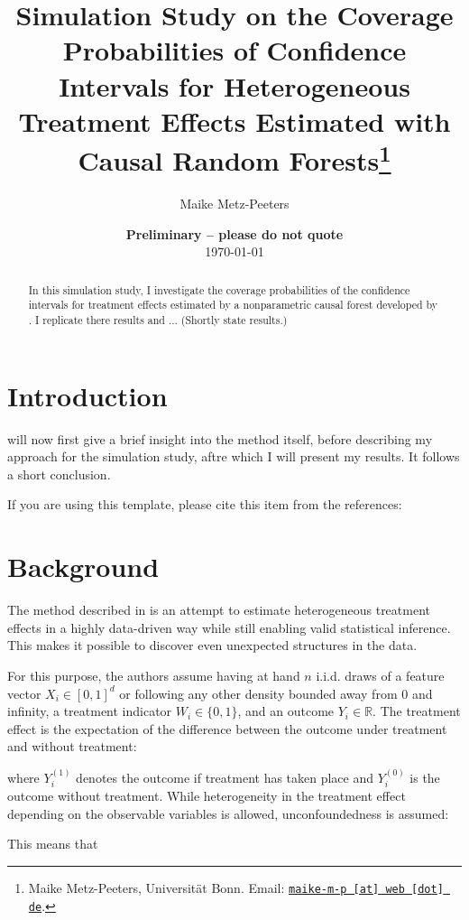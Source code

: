 \documentclass[11pt, a4paper, leqno]{article}
\begin{document}
\title{Simulation Study on the Coverage Probabilities of Confidence Intervals for Heterogeneous Treatment Effects Estimated with Causal Random Forests\thanks{Maike Metz-Peeters, Universität Bonn. Email: \href{mailto:maike-m-p@web.de}{\nolinkurl{maike-m-p [at] web [dot] de}}.}}

\author{Maike Metz-Peeters}

\date{
{\bf Preliminary -- please do not quote} 
\\[1ex] 
\today
}

\maketitle


\begin{abstract}
	In this simulation study, I investigate the coverage probabilities of the confidence intervals for treatment effects estimated by a nonparametric causal forest developed by \citet{wa18}. I replicate there results and ... 
    (Shortly state results.)
    
\end{abstract}
\clearpage

\section{Introduction} %
\label{sec:introduction}

will now first give a brief insight into the method itself, before describing my approach for the simulation study, aftre which I will present my results. It follows a short conclusion.


If you are using this template, please cite this item from the references: \citet{GaudeckerEconProjectTemplates}


\section{Background} %
\label{sec:background}
The method described in \citet{wa18} is an attempt to estimate heterogeneous treatment effects in a highly data-driven way while still enabling valid statistical inference. This makes it possible to discover even unexpected structures in the data.

For this purpose, the authors assume having at hand \(n\) i.i.d. draws of a feature vector \(X_i \in [0,1]^d\) or following any other density bounded away from 0 and infinity, a treatment indicator \(W_i \in \{0,1\}\), and an outcome \(Y_i \in \mathbb{R}\).
The treatment effect is the expectation of the difference between the outcome under treatment and without treatment:

where \(Y_i^{(1)}\) denotes the outcome if treatment has taken place and \(Y_i^{(0)}\) is the outcome without treatment.
While heterogeneity in the treatment effect depending on the observable variables is allowed, unconfoundedness is assumed:

This means that 
\(\) \(\) \(\) 
\end{document}
